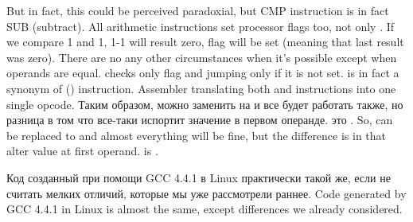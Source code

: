 \label{CMPandSUB}
{But in fact, this could be perceived paradoxial, but CMP instruction is in fact SUB (subtract).}
{All arithmetic instructions set processor flags too, not only \CMP.}
{If we compare 1 and 1, 1-1 will result zero, \ZF flag will be set (meaning that last result was zero).}
{There are no any other circumstances when it's possible except when operands are equal.}
{\JNE checks only \ZF flag and jumping only if it is not set. 
\JNE is in fact a synonym of \JNZ () instruction.}
{Assembler translating both \JNE and \JNZ instructions into one single opcode.}
\IFRU
{Таким образом, можно \CMP заменить на \SUB и все будет работать также, но разница в том что \SUB 
все-таки испортит значение в первом операнде. \CMP это .}
{So, \CMP can be replaced to \SUB and almost everything will be fine, but the difference is in 
that \SUB alter value at first operand. \CMP is .}

\IFRU
{Код созданный при помощи GCC 4.4.1 в Linux практически такой же, если не считать мелких отличий, 
которые мы уже рассмотрели раннее.}
{Code generated by GCC 4.4.1 in Linux is almost the same, except differences we already considered.}
